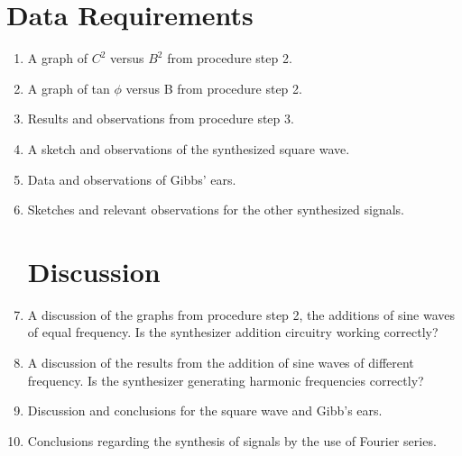 \section{{\bf Data Requirements}}
\begin{enumerate}[resume]

\item A graph of $C^2$ versus $B^2$ from procedure step 2.

\item A graph of tan $\phi$ versus B from procedure step 2.

\item Results and observations from procedure step 3. 

\item A sketch and observations of the synthesized square wave.

\item Data and observations of Gibbs' ears.

\item Sketches and relevant observations for the other synthesized signals.

\section{Discussion}

\item A discussion of the graphs from procedure step 2, the additions of sine waves of equal frequency. Is the synthesizer addition circuitry working correctly?

\item A discussion of the results from the addition of sine waves of different frequency. Is the synthesizer generating harmonic frequencies correctly?

\item Discussion and conclusions for the square wave and Gibb's ears.

\item Conclusions regarding the synthesis of signals by the use of Fourier series.

\end{enumerate}


\AtEndDocument{\clearpage\ifodd\value{page}\else\null\clearpage\fi} %



